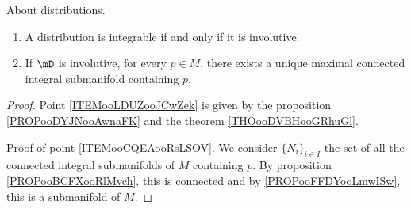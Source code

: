 \begin{theorem}      \label{THOooVRDYooIusxwW}
	About distributions.
	\begin{enumerate}
		\item       \label{ITEMooLDUZooJCwZek}
		      A distribution is integrable if and only if it is involutive.
		\item       \label{ITEMooCQEAooRsLSOV}
		      If \( \mD\) is involutive, for every \( p\in M\), there exists a unique maximal connected integral submanifold containing \( p\).
	\end{enumerate}
\end{theorem}

\begin{proof}
	Point \ref{ITEMooLDUZooJCwZek} is given by the proposition \ref{PROPooDYJNooAwnaFK} and the theorem \ref{THOooDVBHooGRhuGl}.

	Proof of point \ref{ITEMooCQEAooRsLSOV}. We consider \( \{ N_i \}_{i\in I}\) the set of all the connected integral submanifolds of \( M\) containing \( p\). By proposition \ref{PROPooBCFXooRlMvch}, this is connected and by \ref{PROPooFFDYooLmwISw}, this is a submanifold of \( M\).
\end{proof}
